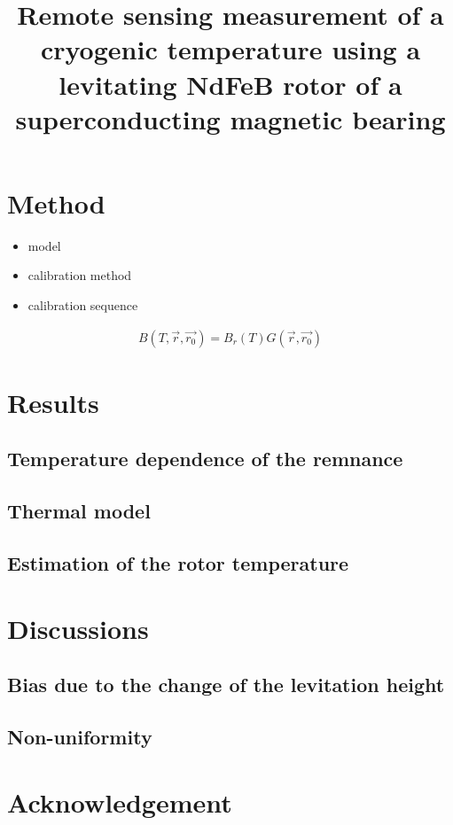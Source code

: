\documentclass[12pt]{amsart}
\title{Remote sensing measurement of a cryogenic temperature using a levitating NdFeB rotor of a superconducting magnetic bearing}
\author{}
\date{} %
\begin{document}
\maketitle
\tableofcontents



\section{Method}

\begin{itemize}
\item model
\item calibration method
\item calibration sequence
\end{itemize}


\begin{eqnarray}
	B(T,\vec{r},\vec{r_0}) = B_r(T) G(\vec{r},\vec{r_0})
\end{eqnarray}



\section{Results}
\subsection{Temperature dependence of the remnance}

\subsection{Thermal model}

\subsection{Estimation of the rotor temperature}

\section{Discussions}
\subsection{Bias due to the change of the levitation height}

\subsection{Non-uniformity}

\section*{Acknowledgement}
\end{document}

